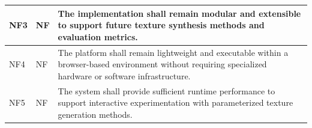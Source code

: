 \begin{table}[H]
\begin{tabularx}{\textwidth}{|l|l|X|}
NF3 & NF &
The implementation shall remain modular and extensible to support future texture synthesis methods and evaluation metrics. \\
\hline

NF4 & NF &
The platform shall remain lightweight and executable within a browser-based environment without requiring specialized hardware or software infrastructure. \\
\hline

NF5 & NF &
The system shall provide sufficient runtime performance to support interactive experimentation with parameterized texture generation methods. \\
\hline

\end{tabularx}
\end{table}